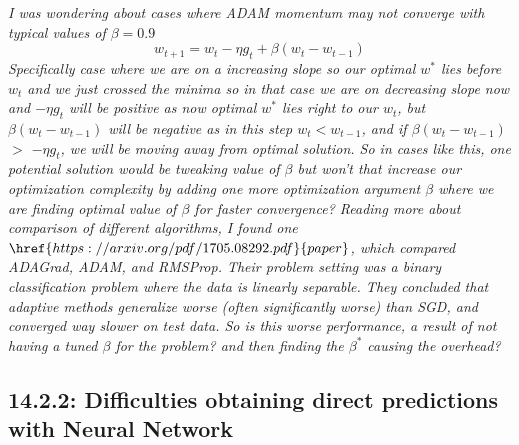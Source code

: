 \documentclass{article}
\begin{document}
\newpage
\textit{I was wondering about cases where ADAM momentum may not converge with typical values of $\beta = 0.9$
\[w_{t+1} = w_{t} - \eta g_{t} +\beta(w_{t} - w_{t-1})\]
Specifically case where we are on a increasing slope so our optimal $w^{*}$ lies before $w_{t}$ and we just crossed the minima so in that case we are on decreasing slope now and $-\eta g_{t}$ will be positive as now optimal $w^{*}$ lies right to our $w_{t}$, but $\beta (w_{t} - w_{t-1})$ will be negative as in this step $w_{t} < w_{t-1}$, and if $\beta (w_{t} - w_{t-1})$ $>$ $-\eta g_{t}$, we will be moving away from optimal solution. So in cases like this, one potential solution would be tweaking value of $\beta$ but won't that increase our optimization complexity by adding one more optimization argument $\beta$ where we are finding optimal value of $\beta$ for faster convergence? Reading more about comparison of different algorithms, I found one $\href{https://arxiv.org/pdf/1705.08292.pdf}{paper}$, which compared ADAGrad, ADAM, and RMSProp. Their problem setting was a binary classification problem where
the data is linearly separable. They concluded that adaptive methods generalize worse (often significantly worse) than SGD, and converged way slower on test data. So is this worse performance, a result of not having a tuned $\beta$ for the problem? and then finding the $\beta^{*}$ causing the overhead?
}

\vspace{5cm}
\vfill




\subsection{14.2.2: Difficulties obtaining direct predictions with Neural Network} 
\end{document}
